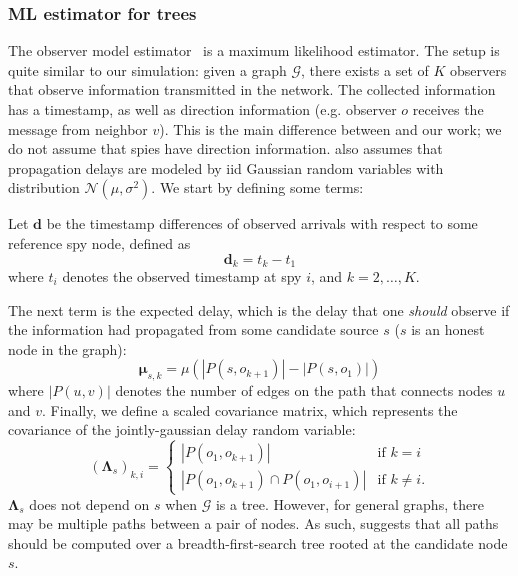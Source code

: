 \subsubsection{ML estimator for trees}
The observer model estimator~\cite{pinto} is a maximum likelihood estimator. The setup is quite similar to our simulation: given a graph $\mathcal G$, there exists a set of $K$ observers that observe information transmitted in the network. The collected information has a timestamp, as well as direction information (e.g. observer $o$ receives the message from neighbor $v$). This is the main difference between \cite{pinto} and our work; we do not assume that spies have direction information. \cite{pinto} also assumes that propagation delays are modeled by iid Gaussian random variables with distribution $\mathcal N(\mu,\sigma^2)$. We start by defining some terms:

Let $\boldsymbol{d}$ be the timestamp differences of observed arrivals with respect to some reference spy node, defined as
\begin{equation}
  \boldsymbol{d}_k = t_{k} - t_1
\end{equation}
where $t_i$ denotes the observed timestamp at spy $i$, and $k = 2,\ldots, K$.

The next term is the expected delay, which is the delay that one \emph{should} observe if the information had propagated from some candidate source $s$ ($s$ is an honest node in the graph):
\begin{equation}
  \boldsymbol{\mu}_{s,k} = \mu (|P(s, o_{k+1})| - |P(s, o_1)|)
\end{equation}
where $|P(u, v)|$ denotes the number of edges on the path that connects nodes $u$ and $v$. Finally, we define a scaled covariance matrix, which represents the covariance of the jointly-gaussian delay random variable:
\begin{equation}
  (\boldsymbol{\Lambda}_s)_{k, i} = \begin{cases}
    |P(o_1, o_{k+1})| & \text{if $k = i$} \\
    |P(o_1, o_{k+1}) \cap P(o_1, o_{i+1})| & \text{if $k \neq i$}.
  \end{cases}
\end{equation}
$\boldsymbol \Lambda_s$ does not depend on $s$ when $\mathcal G$ is a tree. However, for general graphs, there may be multiple paths between a pair of nodes. As such, \cite{pinto} suggests that all paths should be computed over a breadth-first-search tree rooted at the candidate node $s$.


